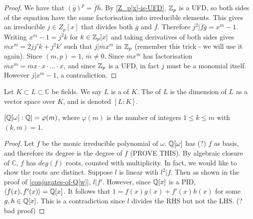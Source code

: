 \begin{proof}
We have that $(\overline{g})^p=\overline{f}\overline{h}$. By \cref{Z_p[x]-is-UFD}, $\mathbb{Z}_p$ is a UFD, so both sides of the equation have the same factorisation into irreducible elements. This gives an irreducible $j\in Z_p[x]$ that divides both $\overline{g}$ and $\overline{f}$. Therefore $j^2|\overline{f}\overline{g}=x^m-1$. Writing $x^m-1=j^2k$ for $k\in \mathbb{Z}_p[x]$ and taking derivatives of both sides gives $\overline{m}x^m=2jj'k+j^2k'$ such that $j|\overline{m}x^m$ in $\mathbb{Z}_p$ (remember this trick - we will use it again). Since $(m,p)=1$, $\overline{m}\neq 0$. Since $\overline{m}x^m$ has factorisation $\overline{m}x^m=\overline{m}x\cdot x\cdot \dots \cdot x$, and since $\mathbb{Z}_p$ is a UFD, in fact $j$ must be a monomial itself. However $j|x^m-1$, a contradiction.
\end{proof}

\begin{definition}
Let $K\subset L\subset \mathbb{C}$ be fields. We say $L$ is a  of $K$. The  of $L$ is the dimension of $L$ as a vector space over $K$, and is denoted $[L:K]$.
\end{definition}



\begin{corollary}\label{Q[w]-degree}
$[\mathbb{Q}[\omega]:\mathbb{Q}]=\varphi(m)$, where $\varphi(m)$ is the number of integers $1\leq k\leq m$ with $(k,m)=1$.
\end{corollary}

\begin{proof} Let $f$ be the monic irreducible polynomial of $\omega$. $\mathbb{Q}[\omega]$ has (?) $f$ as basis, and therefore its degree is the degree of $f$ (PROVE THIS). By algebraic closure of $\mathbb{C}$, $f$ has $deg(f)$ roots, counted with multiplicity. In fact, we would like to show the roots are distinct. Suppose $l$ is linear with $l^2|f$. Then as shown in the proof of \cref{conjugates-of-Q[w]}, $l|f'$. However, since $\mathbb{Q}[x]$ is a PID, $\langle f(x),f'(x) \rangle=\mathbb{Q}[x]$. It follows that $1=f(x)g(x)+f'(x)h(x)$ for some $g,h\in \mathbb{Q}[x]$. This is a contradiction since $l$ divides the RHS but not the LHS. (? bad proof)
\end{proof}

